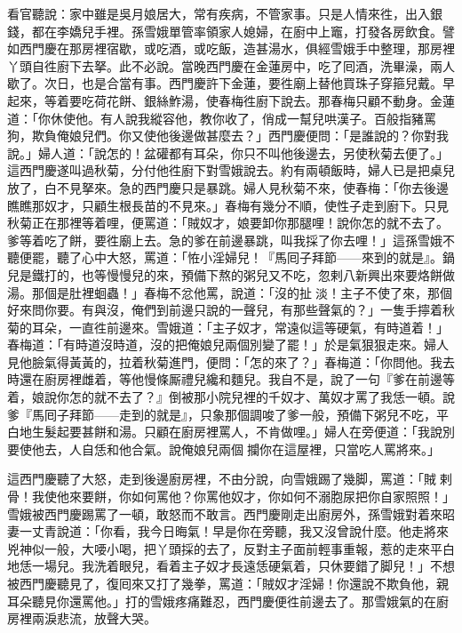 看官聽說：家中雖是吳月娘居大，常有疾病，不管家事。只是人情來徃，出入銀錢，都在李嬌兒手裡。孫雪娥單管率領家人媳婦，在廚中上竈，打發各房飲食。譬如西門慶在那房裡宿歇，或吃酒，或吃飯，造甚湯水，俱經雪娥手中整理，那房裡丫頭自徃廚下去拏。此不必說。當晚西門慶在金蓮房中，吃了囘酒，洗畢澡，兩人歇了。次日，也是合當有事。西門慶許下金蓮，要徃廟上替他買珠子穿箍兒戴。早起來，等着要吃荷花餅、銀絲鮓湯，{}使春梅徃廚下說去。那春梅只顧不動身。金蓮道：「你休使他。{}有人說我縱容他，教你收了，俏成一幫兒哄漢子。百般指豬罵狗，欺負俺娘兒們。你又使他後邊做甚麼去？」西門慶便問：「是誰說的？你對我說。」婦人道：「說怎的！盆礶都有耳朵，{}你只不叫他後邊去，另使秋菊去便了。」這西門慶遂叫過秋菊，分付他徃廚下對雪娥說去。約有兩頓飯時，婦人已是把桌兒放了，{}白不見拏來。急的西門慶只是暴跳。婦人見秋菊不來，使春梅：「你去後邊瞧瞧那奴才，只顧生根長苗的不見來。」春梅有幾分不順，使性子走到廚下。只見秋菊正在那裡等着哩，便罵道：「賊奴才，娘要卸你那腿哩！說你怎的就不去了。爹等着吃了餅，要徃廟上去。急的爹在前邊暴跳，叫我採了你去哩！」這孫雪娥不聽便罷，聽了心中大怒，罵道：「恠小淫婦兒！『馬囘子拜節——來到的就是』。鍋兒是鐵打的，也等慢慢兒的來，預備下熬的粥兒又不吃，忽剌八新興出來要烙餅做湯。那個是肚裡蛔蟲！」{}春梅不忿他罵，說道：「沒的扯𣭈淡！{}主子不使了來，那個好來問你要。有與沒，俺們到前邊只說的一聲兒，有那些聲氣的？」一隻手擰着秋菊的耳朵，一直徃前邊來。雪娥道：「主子奴才，常遠似這等硬氣，有時道着！」春梅道：「有時道沒時道，沒的把俺娘兒兩個別變了罷！」於是氣狠狠走來。婦人見他臉氣得黃黃的，拉着秋菊進門，便問：「怎的來了？」春梅道：「你問他。我去時還在廚房裡雌着，等他慢條厮禮兒纔和麵兒。我自不是，說了一句『爹在前邊等着，娘說你怎的就不去了？』倒被那小院兒裡的{}千奴才、萬奴才罵了我恁一頓。說爹『馬囘子拜節——走到的就是』，只象那個調唆了爹一般，預備下粥兒不吃，平白地生髮起要甚餅和湯。只顧在廚房裡罵人，不肯做哩。」婦人在旁便道：「我說別要使他去，{}人自恁和他合氣。說俺娘兒兩個𢺞攔你在這屋裡，只當吃人罵將來。」

這西門慶聽了大怒，走到後邊廚房裡，不由分說，向雪娥踢了幾脚，罵道：「賊𢱉剌骨！我使他來要餅，你如何罵他？你罵他奴才，你如何不溺胞尿把你自家照照！」{}雪娥被西門慶踢罵了一頓，敢怒而不敢言。西門慶剛走出廚房外，孫雪娥對着來昭妻一丈青說道：「你看，我今日晦氣！早是你在旁聽，我又沒曾說什麼。他走將來兇神似一般，大喓小喝，把丫頭採的去了，反對主子面前輕事重報，惹的走來平白地恁一場兒。我洗着眼兒，看着主子奴才長遠恁硬氣着，只休要錯了脚兒！」不想被西門慶聽見了，復囘來又打了幾拳，{}罵道：「賊奴才淫婦！你還說不欺負他，親耳朵聽見你還罵他。」打的雪娥疼痛難忍，西門慶便徃前邊去了。那雪娥氣的在廚房裡兩淚悲流，放聲大哭。


